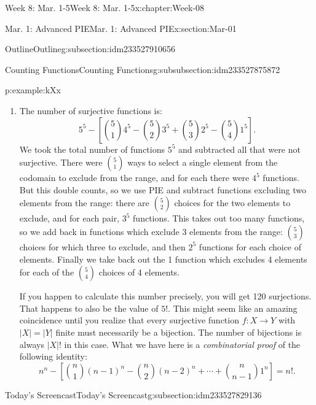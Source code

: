 \documentclass[oneside,10pt,]{book}
\numberwithin{equation}{section}
\newcommand{\card}[1]{\left| #1 \right|}
\begin{document}
\begin{chapterptx}{Week 8: Mar. 1-5}{}{Week 8: Mar. 1-5}{}{}{x:chapter:Week-08}
\begin{sectionptx}{Mar. 1: Advanced PIE}{}{Mar. 1: Advanced PIE}{}{}{x:section:Mar-01}
\begin{subsectionptx}{Outline}{}{Outline}{}{}{g:subsection:idm233527910656}
\begin{subsubsectionptx}{Counting Functions}{}{Counting Functions}{}{}{g:subsubsection:idm233527875872}
\begin{example}{}{p:example:kXx}
\begin{enumerate}
\begin{equation*}
{4 \choose 1}3^5 - {4 \choose 2}2^5 + {4 \choose 3}1^5\text{.}
\end{equation*}
We can now say that the number of functions which are surjective is:%
\begin{equation*}
4^5 - \left[{4 \choose 1}3^5 - {4 \choose 2}2^5 + {4 \choose 3}1^5\right]\text{.}
\end{equation*}
%
\item{}The number of surjective functions is:%
\begin{equation*}
5^5 - \left[{5 \choose 1}4^5 - {5 \choose 2}3^5 + {5 \choose 3}2^5 - {5 \choose 4}1^5\right]\text{.}
\end{equation*}
We took the total number of functions \(5^5\) and subtracted all that were not surjective. There were \({5 \choose 1}\) ways to select a single element from the codomain to exclude from the range, and for each there were \(4^5\) functions. But this double counts, so we use PIE and subtract functions excluding two elements from the range: there are \({5 \choose 2}\) choices for the two elements to exclude, and for each pair, \(3^5\) functions. This takes out too many functions, so we add back in functions which exclude 3 elements from the range: \({5 \choose 3}\) choices for which three to exclude, and then \(2^5\) functions for each choice of elements. Finally we take back out the 1 function which excludes 4 elements for each of the \({5 \choose 4}\) choices of 4 elements.%
\par
If you happen to calculate this number precisely, you will get 120 surjections. That happens to also be the value of \(5!\). This might seem like an amazing coincidence until you realize that every surjective function \(f:X \to Y\) with \(\card{X} = \card{Y}\) finite must necessarily be a bijection. The number of bijections is always \(\card{X}!\) in this case. What we have here is a \emph{combinatorial proof} of the following identity:%
\begin{equation*}
n^n - \left[{n\choose 1}(n-1)^n - {n \choose 2}(n-2)^n + \cdots + {n \choose n-1}1^n \right] = n!\text{.}
\end{equation*}
%
\end{enumerate}
%
\end{example}
\end{subsubsectionptx}
\end{subsectionptx}
%
%
\typeout{************************************************}
\typeout{************************************************}
%
\begin{subsectionptx}{Today's Screencast}{}{Today's Screencast}{}{}{g:subsection:idm233527829136}

\end{subsectionptx}
\end{sectionptx}
\end{chapterptx}
\end{document}
